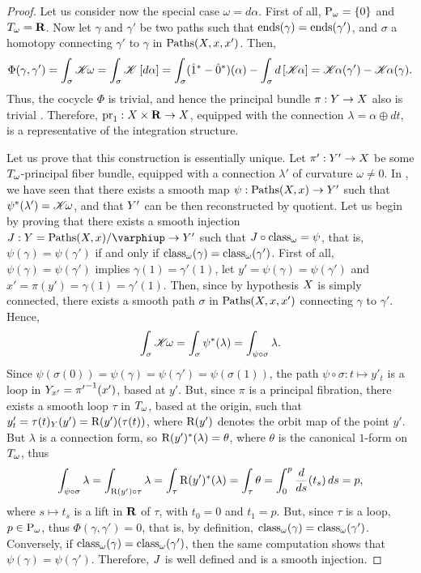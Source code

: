 \begin{proof}
  Let us consider now the special case $\omega = d\alpha$.
  First of all,
  ${\operatorname{P}}_\omega = \{0\}$ and $T_\omega = {\mathbf R}$.
  Now let $\gamma$ and $\gamma'$ be two paths such that $\operatorname{ends}(\gamma) = \operatorname{ends}(\gamma')$,
  and $\sigma$ a homotopy connecting $\gamma'$ to $\gamma$ in $\operatorname{Paths}(X,x,x')$.
  Then,
  $$%
  \Phi(\gamma,\gamma') = \int_\sigma\CHK\!\omega
  =  \int_\sigma \CHK\left [d\alpha\right]
  =  \int_\sigma (\1^* - \0^*)(\alpha) - \int_\sigma d\left[\CHK\!\alpha\right]
  =  \CHK\!\alpha(\gamma') - \CHK\!\alpha(\gamma).
  $$%
  Thus,
  the cocycle $\Phi$ is trivial,
  and hence the principal bundle $\pi : Y \to X$ also is trivial .
  Therefore,
  $\mathrm{pr}_1 : X \times {\mathbf R} \to X$,
  equipped with the connection $\lambda = \alpha \oplus dt$,
  is a representative of the integration structure.
  
  Let us prove that this construction is essentially unique.
  Let $\pi' : Y' \to X$ be some $T_\omega$-principal fiber bundle,
  equipped with a connection $\lambda'$ of curvature $\omega \neq 0$.
  In ,
  we have seen that there exists a smooth map $\psi : \operatorname{Paths}(X,x) \to Y'$ such that $\psi^*(\lambda') = \mathscr{K}\!\omega$,
  and that $Y'$ can be then reconstructed by quotient.
  Let us begin by proving that there exists a smooth injection $\J : \Y = \Paths(\X,x)/\phi \to \Y'$ such that $J \circ \operatorname{class}_\omega = \psi$,
  that is,
  $\psi(\gamma) = \psi(\gamma')$ if and only if $\operatorname{class}_\omega(\gamma) = \operatorname{class}_\omega(\gamma')$.
  First of all,
  $\psi(\gamma) = \psi(\gamma')$ implies $\gamma(1) = \gamma'(1)$,
  let  $y' = \psi(\gamma) = \psi(\gamma')$  and $x' = \pi(y') = \gamma(1) = \gamma'(1)$.
  Then,
  since by hypothesis $X$ is simply connected,
  there exists a smooth path $\sigma$ in $\operatorname{Paths}(X,x,x')$ connecting $\gamma$ to $\gamma'$.
  Hence,
  $$%
  \int_\sigma \CHK\!\omega = \int_\sigma \psi^*(\lambda) = \int_{\psi \circ \sigma} \lambda.
  $$%
  Since $\psi(\sigma(0)) = \psi(\gamma) = \psi(\gamma') = \psi(\sigma(1))$,
  the path $\psi \circ \sigma : t \mapsto y'_t$ is a loop in $Y_{x'} = {\pi'}^{-1}(x')$,
  based at $y'$.
  But,
  since $\pi$ is a principal fibration,
  there exists a smooth loop $\tau$ in $T_\omega$,
  based at the origin, such that $y'_t = \tau(t)_Y(y') = \mathrm{R}(y')(\tau (t))$,
  where $\mathrm{R}(y')$ denotes the orbit map of the point $y'$.
  But $\lambda$ is a connection form,
  so $\mathrm{R}(y')^*(\lambda) = \theta$,
  where $\theta$ is the canonical $1$-form on $T_\omega$,
  thus
  $$%
  \int_{\psi \circ \sigma} \lambda = \int_{\orb{y'} \circ \tau} \lambda = \int_\tau \orb{y'}^*(\lambda) = \int_\tau \theta = \int_{0}^{p} {d\over ds}(t_s)\, ds = p,
  $$%
  where $s \mapsto t_s$ is a lift in ${\mathbf R}$ of $\tau$,
  with $t_0 = 0$ and $t_1 = p$.
  But,
  since $\tau$ is a loop,
  $p \in {\operatorname{P}}_\omega$,
  thus $\Phi(\gamma,\gamma') = 0$,
  that is,
  by definition,
  $\operatorname{class}_\omega(\gamma) = \operatorname{class}_\omega(\gamma')$.
  Conversely,
  if $\operatorname{class}_\omega(\gamma) = \operatorname{class}_\omega(\gamma')$,
  then the same computation shows that $\psi(\gamma) = \psi(\gamma')$.
  Therefore,
  $J$ is well defined and is a smooth injection.
  

\end{proof}
